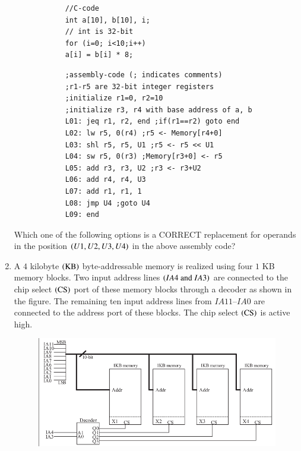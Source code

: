 \documentclass[journal,12pt,onecolumn]{IEEEtran}
\theoremstyle{remark}
\begin{document}
\begin{enumerate}
		\begin{verbatim}
			//C-code
			int a[10], b[10], i;
			// int is 32-bit
			for (i=0; i<10;i++)
			a[i] = b[i] * 8;
		\end{verbatim}
		\underline{\hspace{9cm}}
		\begin{verbatim}
			;assembly-code (; indicates comments)
			;r1-r5 are 32-bit integer registers
			;initialize r1=0, r2=10
			;initialize r3, r4 with base address of a, b
			L01: jeq r1, r2, end ;if(r1==r2) goto end
			L02: lw r5, 0(r4) ;r5 <- Memory[r4+0]
			L03: shl r5, r5, U1 ;r5 <- r5 << U1
			L04: sw r5, 0(r3) ;Memory[r3+0] <- r5
			L05: add r3, r3, U2 ;r3 <- r3+U2
			L06: add r4, r4, U3
			L07: add r1, r1, 1
			L08: jmp U4 ;goto U4
			L09: end
		\end{verbatim}
		
		Which one of the following options is a CORRECT replacement for operands in the position $\left(U1, U2, U3, U4\right)$ in the above assembly code?
		
		\hfill{}
		
		\begin{enumerate}
		\end{enumerate}
		
		\item A $4$ kilobyte $\left(\text{KB}\right)$ byte-addressable memory is realized using four $1$ KB memory blocks. Two input address lines $\left(IA4 \text{ and } IA3\right)$ are connected to the chip select $\left(\text{CS}\right)$ port of these memory blocks through a decoder as shown in the figure. The remaining ten input address lines from $IA11$–$IA0$ are connected to the address port of these blocks. The chip select $\left(\text{CS}\right)$ is active high.
\begin{figure}[H]
	\centering
	\includegraphics[width=0.5\linewidth]{figs/screenshot015}
	\caption{}
	\label{fig:screenshot015}
\end{figure}
		

\end{enumerate}
\end{document}
